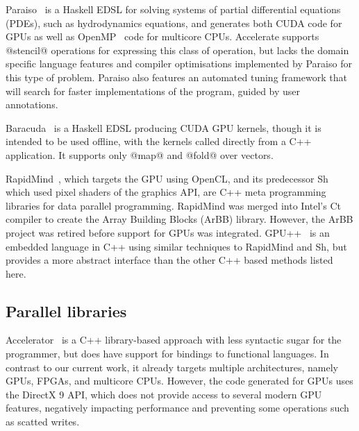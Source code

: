 
Paraiso~\cite{Muranushi:2012eh} is a Haskell EDSL for solving systems of
partial differential equations (PDEs), such as hydrodynamics equations,
and generates both CUDA code for GPUs as well as OpenMP~\cite{OpenMP:2008} code
for multicore CPUs. Accelerate supports @stencil@ operations for expressing this
class of operation, but lacks the domain specific language features and compiler
optimisations implemented by Paraiso for this type of problem. Paraiso also
features an automated tuning framework that will search for faster
implementations of the program, guided by user annotations.

Baracuda~\cite{Larsen:2011fa} is a Haskell EDSL producing CUDA GPU kernels,
though it is intended to be used offline, with the kernels called directly from
a C++ application. It supports only @map@ and @fold@ over vectors.

RapidMind~\cite{LinXu:2008ig}, which targets the GPU using OpenCL, and its
predecessor Sh~\cite{McCool:2004,McCool:2004un} which used pixel shaders of the
graphics API, are C++ meta programming libraries for data parallel programming.
RapidMind was merged into Intel's Ct compiler to create the Array Building
Blocks (ArBB) library. However, the ArBB project was retired before support for
GPUs was integrated. GPU++~\cite{Jansen:2008vw} is an embedded language in C++
using similar techniques to RapidMind and Sh, but provides a more abstract
interface than the other C++ based methods listed here.


\subsection{Parallel libraries}


Accelerator~\cite{Bond:2010bd,Tarditi:2006} is a C++ library-based approach with
less syntactic sugar for the programmer, but does have support for bindings to
functional languages. In contrast to our current work, it already targets
multiple architectures, namely GPUs, FPGAs, and multicore CPUs. However, the
code generated for GPUs uses the DirectX 9 API, which does not provide access to
several modern GPU features, negatively impacting performance and preventing
some operations such as scatted writes.

